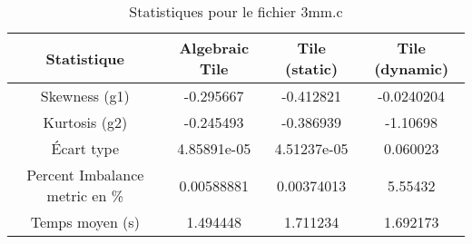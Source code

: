 \documentclass{article}
\begin{document}
\begin{table}[htbp]
  \centering
  \caption{Statistiques pour le fichier 3mm.c}
  \begin{tabular}{|c|c|c|c|}
    \hline
    Statistique & Algebraic Tile & Tile (static) & Tile (dynamic) \\ 
    \hline
    Skewness (g1) & -0.295667 & -0.412821 & -0.0240204 \\ 
    Kurtosis (g2) & -0.245493 & -0.386939 & -1.10698 \\ 
    Écart type & 4.85891e-05 & 4.51237e-05 & 0.060023\\ 
    Percent Imbalance metric en \% & 0.00588881 & 0.00374013 & 5.55432\\ 
    Temps moyen (s) & 1.494448 & 1.711234 & 1.692173 \\ 
    \hline
  \end{tabular}
\end{table}
\newpage
\end{document}
